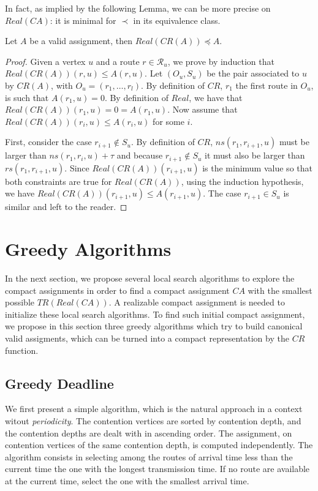 In fact, as implied by the following Lemma, we can be more precise on $Real(CA)$: it is minimal for $\prec$ in its equivalence class.

\begin{lemma}\label{lemma:prec}
Let $A$ be a valid assignment, then $Real(CR(A)) \preceq A$.
\end{lemma}
\begin{proof}
Given a vertex $u$ and a route $r \in \mathcal{R}_u$, we prove by induction that $Real(CR(A))(r,u) \leq A(r,u)$.
Let $(O_u,S_u)$ be the pair associated to $u$ by $CR(A)$, with $O_u = (r_1,\dots,r_l)$. By definition of $CR$, $r_1$ the first route in $O_u$, is such that $A(r_1,u) = 0$. By definition of $Real$, we have that  $Real(CR(A))(r_1,u) = 0 = A(r_1,u)$.
Now assume that $Real(CR(A))(r_i,u) \leq A(r_i,u)$ for some $i$. 

First, consider the case $r_{i+1} \notin S_u$. By definition of $CR$, $ns(r_1,r_{i+1},u)$ must be larger than 
$ns(r_1,r_{i},u)+ \tau$ and because $r_{i+1} \notin S_u$ it must also be larger than $rs(r_1,r_{i+1},u)$. 
Since $Real(CR(A))(r_{i+1},u)$ is the minimum value so that both constraints are true for $Real(CR(A))$, using
the induction hypothesis, we have $Real(CR(A))(r_{i+1},u) \leq A(r_{i+1},u)$. The case $r_{i+1} \in S_u$ is similar and left to the reader.
\end{proof}


\section{Greedy Algorithms}
 
 In the next section, we propose several local search algorithms to explore the compact assignments in order to find a compact assignment $CA$ with the smallest possible $TR(Real(CA))$. A realizable compact assignment is needed to initialize these local search algorithms. To find such initial compact assignment, we propose in this section three greedy algorithms which try to build canonical valid assigments, which can be turned into a compact representation by the $CR$ function.

\subsection{Greedy Deadline}

We first present a simple algorithm, which is the natural approach in a context witout \emph{periodicity}.
The contention vertices are sorted by contention depth, and the contention depths are dealt with in ascending order. The assignment, on contention vertices of the same contention depth, is computed independently. The \greedydeadline algorithm consists in selecting among the routes of arrival time less than the current time the one with the longest transmission time. If no route are available at the current time, select the one with the smallest arrival time.

